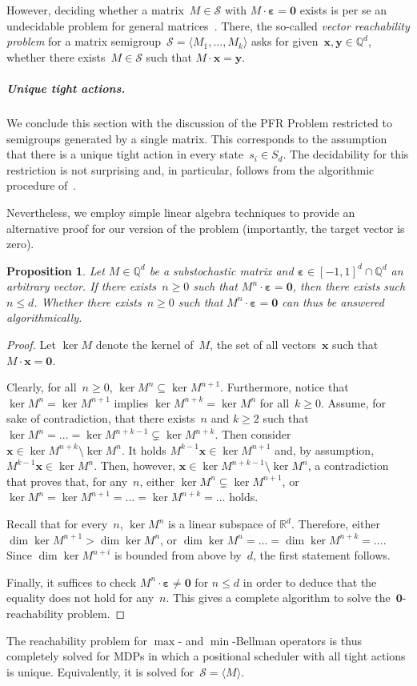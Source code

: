 \documentclass[preprint,12pt]{elsarticle}
\theoremstyle{plain}
\newtheorem{proposition}[theorem]{Proposition}
\theoremstyle{definition}
\theoremstyle{remark}
\theoremstyle{claimstyle}
\newcommand{\RR}{\mathbb{R}}
\newcommand{\QQ}{\mathbb{Q}}
\newcommand{\eps}{\bm{\varepsilon}}
\begin{document}
However, deciding whether a matrix~$M \in \mathcal{S}$ with $M\cdot\eps = \bm{0}$ exists is per se an undecidable problem for general matrices~\cite{Bell2008undec}.
There, the so-called \emph{vector reachability problem} for a matrix semigroup~$\mathcal{S} = \langle M_1, \dots, M_k \rangle$ asks for given~$\bm{x}, \bm{y} \in \QQ^d$, whether there exists~$M \in \mathcal{S}$ such that $M\cdot \bm{x} = \bm{y}$.
\subparagraph*{Unique tight actions.}
We conclude this section with the discussion of the PFR Problem restricted to semigroups generated by a single matrix.
This corresponds to the assumption that there is a unique tight action in every state~$s_i \in S_d$.
The decidability for this restriction is not surprising and, in particular, 
follows from the algorithmic procedure of~\cite{kannan1980decid}.

Nevertheless, we employ simple linear algebra techniques
to provide an alternative proof for our version of the problem (importantly, the target vector is zero).
\begin{proposition}\label{position-dec}
	Let $M \in \QQ^d$ be a substochastic matrix and $\eps \in [-1,1]^d\cap \QQ^d$ an arbitrary vector.
	If there exists~$n \geq 0$ such that
	$M^n \cdot \eps = \bm{0}$, then
	there exists such $n \leq d$.
	Whether there exists~$n \geq 0$ such that
	$M^n \cdot \eps = \bm{0}$ can thus be answered algorithmically.
\end{proposition}
\begin{proof}
	Let $\ker M$ denote the kernel of~$M$, the set of all vectors~$\bm{x}$ such that~$M \cdot \bm{x} = \bm{0}$.
	
	Clearly, for all~$n\geq 0$, $\ker M^n \subseteq \ker M^{n+1}$.
	Furthermore, notice that $\ker M^n = \ker M^{n+1}$ implies $\ker M^{n+k} = \ker M^n$ for all~$k \geq 0$.
	Assume, for sake of contradiction, that there exists~$n$ and $k \geq 2$ such that $\ker M^n = \dots = \ker M^{n+k-1} \subsetneq \ker M^{n+k}$.
	Then consider~$\bm{x} \in \ker M^{n+k} \setminus \ker M^n$.
	It holds $M^{k-1}\bm{x} \in \ker M^{n+1}$ and, by assumption, $M^{k-1}\bm{x} \in \ker M^n$. 
	Then, however, $\bm{x} \in \ker M^{n+k -1} \setminus \ker M^n$, a contradiction that proves that, for any~$n$, either
	$\ker M^n \subsetneq \ker M^{n+1}$,
	or $\ker M^n = \ker M^{n+1} = \dots = \ker M^{n+k} = \dots$ holds.
	
	Recall that for every~$n$, $\ker M^n$ is a linear subspace of $\RR^d$.
	Therefore, either $\dim\ker M^{n+1} > \dim\ker M^n$, or $\dim\ker M^n = \dots = \dim \ker M^{n+k} = \dots$.
	Since $\dim\ker M^{n+i}$ is bounded from above by~$d$, the first statement follows.
	
	Finally, it suffices to check $M^n \cdot \eps \neq \bm{0}$ for $n \leq d$ in order to deduce that the equality does not hold for any~$n$.
	This gives a complete algorithm to solve the~$\bm{0}$-reachability problem.
\end{proof}
The reachability problem for $\max$- and $\min$-Bellman operators is thus completely solved for MDPs in which 
a positional scheduler with all tight actions is unique.
Equivalently, it is solved for~$\mathcal{S} = \langle M \rangle$.
\end{document}
